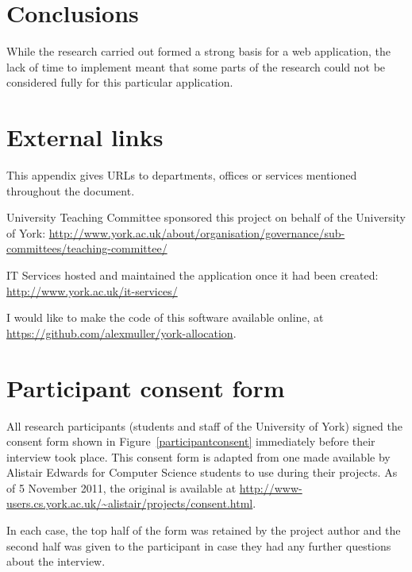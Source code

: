 \documentclass[]{scrartcl}
\begin{document}
\section{Conclusions}
\label{sec:conclusions}


While the research carried out formed a strong basis for a web application,
the lack of time to implement meant that some parts of the research could not
be considered fully for this particular application.

\appendix


\clearpage
\section{External links}

This appendix gives URLs to departments, offices or services mentioned
throughout the document.

University Teaching Committee sponsored this project on behalf of the
University of York:
\url{http://www.york.ac.uk/about/organisation/governance/sub-committees/teaching-committee/}

IT Services hosted and maintained the application once it had been created:
\url{http://www.york.ac.uk/it-services/}

I would like to make the code of this software available online, at
\url{https://github.com/alexmuller/york-allocation}.

\clearpage
\section{Participant consent form}
\label{sec:consent}

All research participants (students and staff of the University of York)
signed the consent form shown in Figure~\ref{participantconsent} immediately
before their interview took place. This consent form is adapted from one made
available by Alistair Edwards for Computer Science students to use during
their projects. As of 5 November 2011, the original is available at
\url{http://www-users.cs.york.ac.uk/~alistair/projects/consent.html}.

In each case, the top half of the form was retained by the project author and
the second half was given to the participant in case they had any further
questions about the interview.
\end{document}
